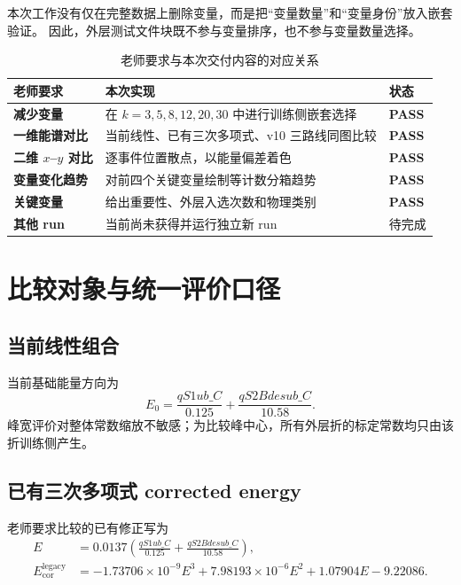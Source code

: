 \documentclass[11pt,a4paper]{ctexart}
\newcommand{\pass}{\textcolor{pandaxgreen}{\textbf{PASS}}}
\begin{document}
本次工作没有仅在完整数据上删除变量，而是把“变量数量”和“变量身份”放入嵌套验证。
因此，外层测试文件块既不参与变量排序，也不参与变量数量选择。

\begin{table}[H]
\centering
\caption{老师要求与本次交付内容的对应关系}
\begin{tabularx}{\textwidth}{>{\bfseries}p{}X>{\centering\arraybackslash}p{}}
\toprule
老师要求 & 本次实现 & 状态\\
\midrule
减少变量 & 在 $k=3,5,8,12,20,30$ 中进行训练侧嵌套选择 & \pass\\
一维能谱对比 & 当前线性、已有三次多项式、v10 三路线同图比较 & \pass\\
二维 $x$--$y$ 对比 & 逐事件位置散点，以能量偏差着色 & \pass\\
变量变化趋势 & 对前四个关键变量绘制等计数分箱趋势 & \pass\\
关键变量 & 给出重要性、外层入选次数和物理类别 & \pass\\
其他 run & 当前尚未获得并运行独立新 run & 待完成\\
\bottomrule
\end{tabularx}
\end{table}

\section{比较对象与统一评价口径}

\subsection{当前线性组合}

当前基础能量方向为
\begin{equation}
E_0=
\frac{qS1ub\_C}{0.125}
+\frac{qS2Bdesub\_C}{10.58}.
\end{equation}
峰宽评价对整体常数缩放不敏感；为比较峰中心，所有外层折的标定常数均只由该折训练侧产生。

\subsection{已有三次多项式 corrected energy}

老师要求比较的已有修正写为
\begin{align}
E &=0.0137\left(
\frac{qS1ub\_C}{0.125}
+\frac{qS2Bdesub\_C}{10.58}
\right),\\
E_{\mathrm{cor}}^{\mathrm{legacy}}
&=-1.73706\times10^{-9}E^3
+7.98193\times10^{-6}E^2
+1.07904E-9.22086.
\end{align}
\end{document}
